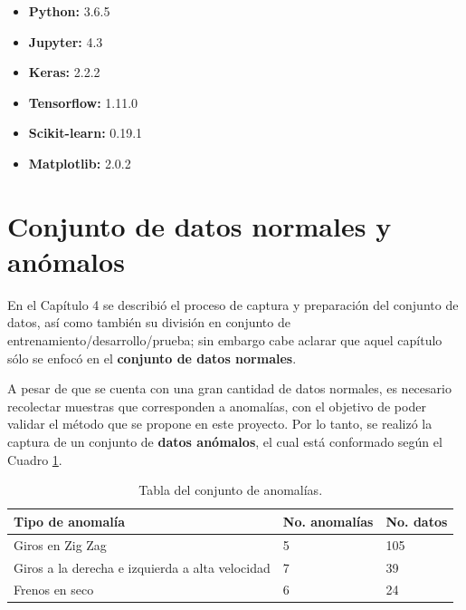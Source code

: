 \begin{itemize}
\item \textbf{Python:} 3.6.5

\item \textbf{Jupyter:} 4.3

\item \textbf{Keras:} 2.2.2

\item \textbf{Tensorflow:} 1.11.0

\item \textbf{Scikit-learn:} 0.19.1

\item \textbf{Matplotlib:} 2.0.2
\end{itemize}

\section{Conjunto de datos normales y an\'{o}malos}

En el Cap\'{i}tulo 4 se describi\'{o} el proceso de captura y preparaci\'{o}n del conjunto de datos, as\'{i} como tambi\'{e}n su divisi\'{o}n en conjunto de entrenamiento/desarrollo/prueba; sin embargo cabe aclarar que aquel cap\'{i}tulo s\'{o}lo se enfoc\'{o} en el \textbf{conjunto de datos normales}.%

\vspace{5mm} %

A pesar de que se cuenta con una gran cantidad de datos normales, es necesario recolectar muestras que corresponden a anomal\'{i}as, con el objetivo de poder validar el m\'{e}todo que se propone en este proyecto. Por lo tanto, se realiz\'{o} la captura de un conjunto de \textbf{datos an\'{o}malos}, el cual est\'{a} conformado seg\'{u}n el Cuadro \ref{table:conjunto_anomalias}.

\begin{table}[H]
\centering
\begin{tabular}{|l|l|l|}
\hline
\textbf{Tipo de anomal\'{i}a} & \textbf{No. anomal\'{i}as} & \textbf{No. datos} \\ \hline
Giros en Zig Zag & 5 & 105  \\ \hline
Giros a la derecha e izquierda a alta velocidad & 7 & 39  \\ \hline
Frenos en seco & 6 & 24 \\ \hline
\end{tabular}
\caption{Tabla del conjunto de anomal\'{i}as.}
\label{table:conjunto_anomalias}
\end{table}


